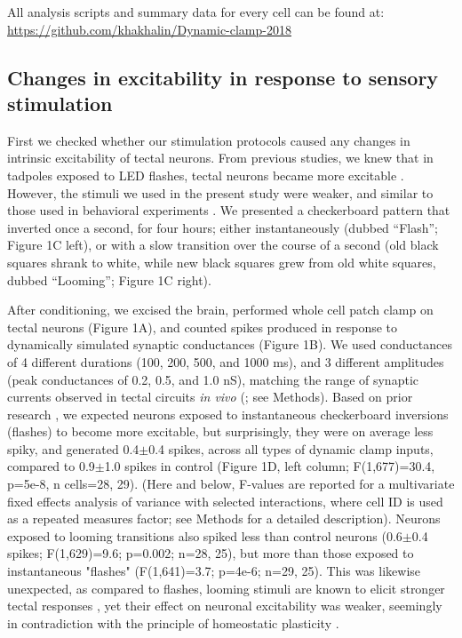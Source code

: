\documentclass{article}
\begin{document}
All analysis scripts and summary data for every cell can be found at:  \url{https://github.com/khakhalin/Dynamic-clamp-2018}

\subsection*{Changes in excitability in response to sensory stimulation}

First we checked whether our stimulation protocols caused any changes in intrinsic excitability of tectal neurons. From previous studies, we knew that in tadpoles exposed to LED flashes, tectal neurons became more excitable \citep{aizenman2003,ciarleglio2015}. However, the stimuli we used in the present study were weaker, and similar to those used in behavioral experiments \citep{khakhalin2014,james2015,truszkowski2017}. We presented a checkerboard pattern that inverted once a second, for four hours; either instantaneously (dubbed “Flash”; Figure 1C left), or with a slow transition over the course of a second (old black squares shrank to white, while new black squares grew from old white squares, dubbed “Looming”; Figure 1C right).

After conditioning, we excised the brain, performed whole cell patch clamp on tectal neurons (Figure 1A), and counted spikes produced in response to dynamically simulated synaptic conductances (Figure 1B). We used conductances of 4 different durations (100, 200, 500, and 1000 ms), and 3 different amplitudes (peak conductances of 0.2, 0.5, and 1.0 nS), matching the range of synaptic currents observed in tectal circuits \textit{in vivo} (\citealt{xu2011,khakhalin2014,ciarleglio2015}; see Methods). Based on prior research \citep{aizenman2003,ciarleglio2015}, we expected neurons exposed to instantaneous checkerboard inversions (flashes) to become more excitable, but surprisingly, they were on average less spiky, and generated 0.4$\pm$0.4 spikes, across all types of dynamic clamp inputs, compared to 0.9$\pm$1.0 spikes in control (Figure 1D, left column; F(1,677)=30.4, p=5e-8, n cells=28, 29). (Here and below, F-values are reported for a multivariate fixed effects analysis of variance with selected interactions, where cell ID is used as a repeated measures factor; see Methods for a detailed description). Neurons exposed to looming transitions also spiked less than control neurons (0.6$\pm$0.4 spikes; F(1,629)=9.6; p=0.002; n=28, 25), but more than those exposed to instantaneous "flashes" (F(1,641)=3.7; p=4e-6; n=29, 25). This was likewise unexpected, as compared to flashes, looming stimuli are known to elicit stronger tectal responses \citep{khakhalin2014,khakhalin2019graph}, yet their effect on neuronal excitability was weaker, seemingly in contradiction with the principle of homeostatic plasticity \citep{pratt2007,turrigiano2007}.
\end{document}
